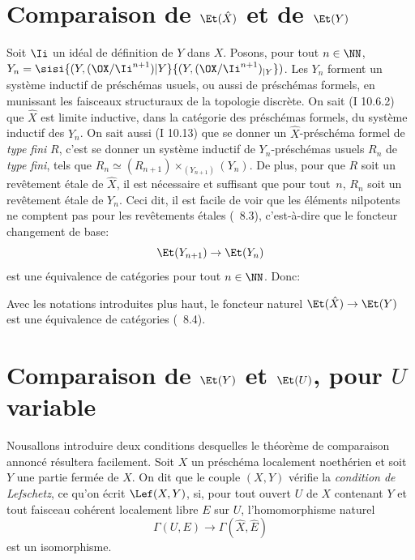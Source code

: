 \enlargethispage{3mm}%
\section{Comparaison de $\Et(\hat{X})$ et de $\Et(Y)$} \label{X.1}

Soit $\Ii$ un id\'eal de d\'efinition de $Y$ dans $X$. Posons, pour tout $n\in\NN$, $Y_n=\sisi{(Y, (\OX/\Ii^{n+1}){|Y}}{(Y, (\OX/\Ii^{n+1})_{|Y}})$. Les $Y_n$ forment un syst\`eme inductif de pr\'esch\'emas usuels, ou aussi de pr\'esch\'emas formels, en munissant les faisceaux structuraux de la topologie discr\`ete. On sait (\EGA I 10.6.2) que $\hat{X}$ est limite inductive, dans la cat\'egorie des pr\'esch\'emas formels, du syst\`eme inductif des $Y_n$. On sait aussi (\EGA I 10.13) que se donner un $\hat{X}$-pr\'esch\'ema formel de \emph{type fini} $R$, c'est se donner un syst\`eme inductif de $Y_n$-pr\'esch\'emas usuels $R_n$ de \emph{type fini}, tels que $R_n\simeq(R_{n+1})\times_{(Y_{n+1})}(Y_n)$. De plus, pour que $R$ soit un rev\^etement \'etale de $\hat{X}$, il est n\'ecessaire et suffisant que pour tout~$n$, $R_n$ soit un rev\^etement \'etale de $Y_n$. Ceci dit, il est facile de voir que les \'el\'ements nilpotents ne comptent pas pour les rev\^etements \'etales (\SGA {}~8.3), c'est-\`a-dire que le foncteur changement de base:
\[
\Et(Y_{n+1}) \to \Et(Y_n)
\]
est une \'equivalence de cat\'egories pour tout $n\in\NN$. Donc:

\begin{proposition} \label{X.1.1}
Avec les notations introduites plus haut, le foncteur naturel $\Et(\hat{X})\to\Et(Y)$ est une \'equivalence de cat\'egories (\cf \textup{\SGA {}~8.4}).
\end{proposition}

\section{Comparaison de $\Et(Y)$ et $\Et(U)$, pour $U$ variable} \label{X.2}

Nous\pageoriginale allons introduire deux conditions desquelles le th\'eor\`eme de comparaison annonc\'e r\'esultera facilement. Soit $X$ un pr\'esch\'ema localement noeth\'erien et soit $Y$ une partie ferm\'ee de $X$. On dit que le couple $(X, Y)$ v\'erifie la \emph{condition de Lefschetz}, ce qu'on \'ecrit $\Lef(X, Y)$,\label{pX.2} si, pour tout ouvert $U$ de $X$ contenant $Y$ et tout faisceau coh\'erent localement libre $E$ sur $U$, l'homomorphisme naturel
\[
\Gamma(U, E) \to \Gamma(\hat{X}, \hat{E})
\]
est un isomorphisme.

